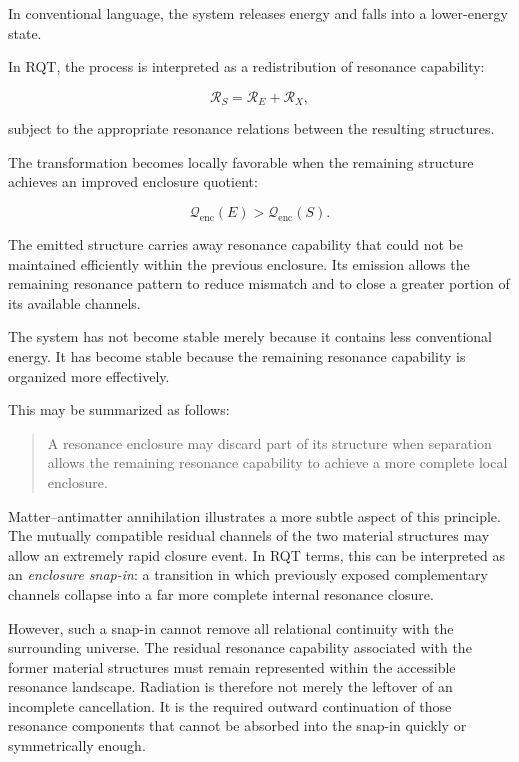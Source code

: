 \documentclass[11pt,a4paper]{article}
\begin{document}
In conventional language, the system releases energy and falls into a lower-energy state.

In RQT, the process is interpreted as a redistribution of resonance capability:

\begin{equation}
    \mathcal{R}_{S}
    =
    \mathcal{R}_{E}
    +
    \mathcal{R}_{X},
    \label{eq:resonance_capability_redistribution}
\end{equation}

subject to the appropriate resonance relations between the resulting structures.

The transformation becomes locally favorable when the remaining structure achieves an improved enclosure quotient:

\begin{equation}
    \mathcal{Q}_{\mathrm{enc}}(E)
    >
    \mathcal{Q}_{\mathrm{enc}}(S).
\end{equation}

The emitted structure carries away resonance capability that could not be maintained efficiently within the previous enclosure. Its emission allows the remaining resonance pattern to reduce mismatch and to close a greater portion of its available channels.

The system has not become stable merely because it contains less conventional energy. It has become stable because the remaining resonance capability is organized more effectively.

This may be summarized as follows:

\begin{quote}
A resonance enclosure may discard part of its structure when separation allows the remaining resonance capability to achieve a more complete local enclosure.
\end{quote}

Matter--antimatter annihilation illustrates a more subtle aspect of this principle. The mutually compatible residual channels of the two material structures may allow an extremely rapid closure event. In RQT terms, this can be interpreted as an \emph{enclosure snap-in}: a transition in which previously exposed complementary channels collapse into a far more complete internal resonance closure.

However, such a snap-in cannot remove all relational continuity with the surrounding universe. The residual resonance capability associated with the former material structures must remain represented within the accessible resonance landscape. Radiation is therefore not merely the leftover of an incomplete cancellation.
It is the required outward continuation of those resonance components that cannot be absorbed into the snap-in quickly or symmetrically enough.
\end{document}

